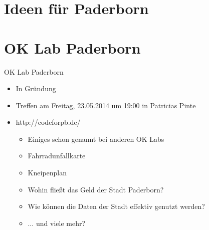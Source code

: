 \section{Ideen für Paderborn}

\section{OK Lab Paderborn}
\begin{frame}{OK Lab Paderborn}
 \begin{itemize}
  \item In Gründung
  \item Treffen am Freitag, 23.05.2014 um 19:00 in Patricias Pinte
  \item http://codeforpb.de/
  \begin{itemize}
   \item Einiges schon genannt bei anderen OK Labs
   \item Fahrradunfallkarte
   \item Kneipenplan
   \item Wohin fließt das Geld der Stadt Paderborn?
   \item Wie können die Daten der Stadt effektiv genutzt werden?
   \item $\dots$ und viele mehr?
  \end{itemize}
 \end{itemize}
\end{frame}
